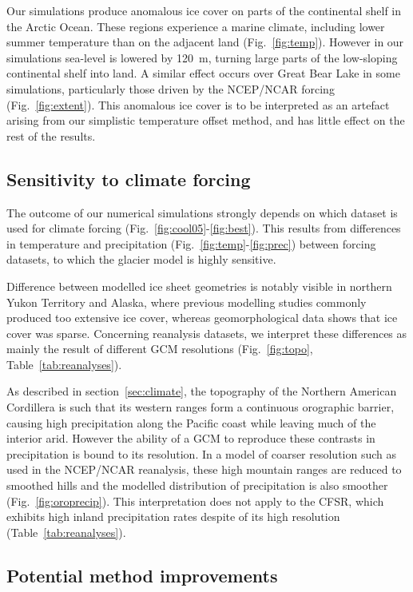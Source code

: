 Our simulations produce anomalous ice cover on parts of the continental shelf in the Arctic Ocean. These regions experience a marine climate, including lower summer temperature than on the adjacent land (Fig.~\ref{fig:temp}). However in our simulations sea-level is lowered by 120~m, turning large parts of the low-sloping continental shelf into land. A similar effect occurs over Great Bear Lake in some simulations, particularly those driven by the NCEP/NCAR forcing (Fig.~\ref{fig:extent}). This anomalous ice cover is to be interpreted as an artefact arising from our simplistic temperature offset method, and has little effect on the rest of the results.

\subsection{Sensitivity to climate forcing}

The outcome of our numerical simulations strongly depends on which dataset is used for climate forcing (Fig.~\ref{fig:cool05}-\ref{fig:best}). This results from differences in temperature and precipitation (Fig.~\ref{fig:temp}-\ref{fig:prec}) between forcing datasets, to which the glacier model is highly sensitive.

Difference between modelled ice sheet geometries is notably visible in northern Yukon Territory and Alaska, where previous modelling studies commonly produced too extensive ice cover, whereas geomorphological data shows that ice cover was sparse. Concerning reanalysis datasets, we interpret these differences as mainly the result of different GCM resolutions (Fig.~\ref{fig:topo}, Table~\ref{tab:reanalyses}).

As described in section~\ref{sec:climate}, the topography of the Northern American Cordillera is such that its western ranges form a continuous orographic barrier, causing high precipitation along the Pacific coast while leaving much of the interior arid. However the ability of a GCM to reproduce these contrasts in precipitation is bound to its resolution. In a model of coarser resolution such as used in the NCEP/NCAR reanalysis, these high mountain ranges are reduced to smoothed hills and the modelled distribution of precipitation is also smoother (Fig.~\ref{fig:oroprecip}). This interpretation does not apply to the CFSR, which exhibits high inland precipitation rates despite of its high resolution (Table~\ref{tab:reanalyses}).

\subsection{Potential method improvements}


